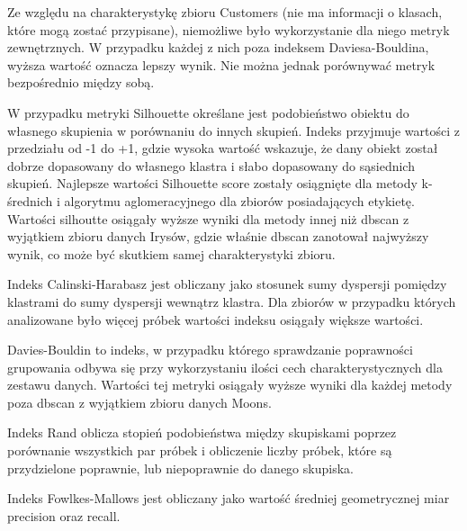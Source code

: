 \documentclass{classrep}
\begin{document}
{{            Ze względu na charakterystykę zbioru Customers (nie ma informacji o
            klasach, które mogą zostać przypisane), niemożliwe było wykorzystanie dla
            niego metryk zewnętrznych. W przypadku każdej z nich poza indeksem
            Daviesa-Bouldina, wyższa wartość oznacza lepszy wynik. Nie można jednak
            porównywać metryk bezpośrednio między sobą.

            W przypadku metryki Silhouette określane jest podobieństwo obiektu do
            własnego skupienia w porównaniu do innych skupień. Indeks przyjmuje
            wartości z przedziału od -1 do +1, gdzie wysoka wartość wskazuje, że dany
            obiekt został dobrze dopasowany do własnego klastra i słabo dopasowany do
            sąsiednich skupień. Najlepsze wartości Silhouette score zostały osiągnięte
            dla metody k-średnich i algorytmu aglomeracyjnego dla zbiorów posiadających
            etykietę. Wartości silhoutte osiągały wyższe wyniki dla metody innej niż
            dbscan z wyjątkiem zbioru danych Irysów, gdzie właśnie dbscan zanotował
            najwyższy wynik, co może być skutkiem samej charakterystyki zbioru.

            Indeks Calinski-Harabasz jest obliczany jako stosunek sumy dyspersji
            pomiędzy klastrami do sumy dyspersji wewnątrz klastra. Dla zbiorów w
            przypadku których analizowane było więcej próbek wartości indeksu osiągały
            większe wartości.

            Davies-Bouldin to indeks, w przypadku którego sprawdzanie poprawności
            grupowania odbywa się przy wykorzystaniu ilości cech charakterystycznych
            dla zestawu danych. Wartości tej metryki osiągały wyższe wyniki dla każdej
            metody poza dbscan z wyjątkiem zbioru danych Moons.

            Indeks Rand oblicza stopień podobieństwa między skupiskami poprzez
            porównanie wszystkich par próbek i obliczenie liczby próbek, które są
            przydzielone poprawnie, lub niepoprawnie do danego skupiska.

            Indeks Fowlkes-Mallows jest obliczany jako wartość średniej geometrycznej
            miar precision oraz recall.
        }

    }
\end{document}
